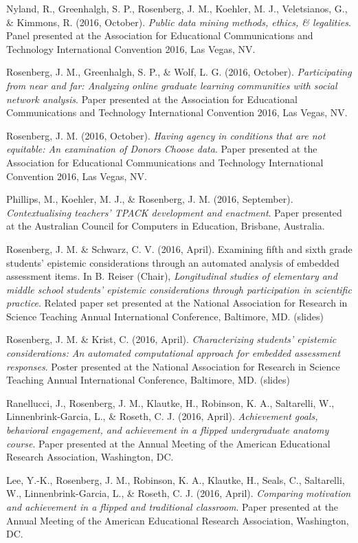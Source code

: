 \documentclass[14,]{article}
\begin{document}
Nyland, R., Greenhalgh, S. P., Rosenberg, J. M., Koehler, M. J.,
Veletsianos, G., \& Kimmons, R. (2016, October). \emph{Public data
mining methods, ethics, \& legalities}. Panel presented at the
Association for Educational Communications and Technology International
Convention 2016, Las Vegas, NV.

Rosenberg, J. M., Greenhalgh, S. P., \& Wolf, L. G. (2016, October).
\emph{Participating from near and far: Analyzing online graduate
learning communities with social network analysis}. Paper presented at
the Association for Educational Communications and Technology
International Convention 2016, Las Vegas, NV.

Rosenberg, J. M. (2016, October). \emph{Having agency in conditions that
are not equitable: An examination of Donors Choose data}. Paper
presented at the Association for Educational Communications and
Technology International Convention 2016, Las Vegas, NV.

Phillips, M., Koehler, M. J., \& Rosenberg, J. M. (2016, September).
\emph{Contextualising teachers' TPACK development and enactment}. Paper
presented at the Australian Council for Computers in Education,
Brisbane, Australia.

Rosenberg, J. M. \& Schwarz, C. V. (2016, April). Examining fifth and
sixth grade students' epistemic considerations through an automated
analysis of embedded assessment items. In B. Reiser (Chair),
\emph{Longitudinal studies of elementary and middle school students'
epistemic considerations through participation in scientific practice}.
Related paper set presented at the National Association for Research in
Science Teaching Annual International Conference, Baltimore, MD.
(slides)

Rosenberg, J. M. \& Krist, C. (2016, April). \emph{Characterizing
students' epistemic considerations: An automated computational approach
for embedded assessment responses}. Poster presented at the National
Association for Research in Science Teaching Annual International
Conference, Baltimore, MD. (slides)

Ranellucci, J., Rosenberg, J. M., Klautke, H., Robinson, K. A.,
Saltarelli, W., Linnenbrink-Garcia, L., \& Roseth, C. J. (2016, April).
\emph{Achievement goals, behavioral engagement, and achievement in a
flipped undergraduate anatomy course}. Paper presented at the Annual
Meeting of the American Educational Research Association, Washington,
DC.

Lee, Y.-K., Rosenberg, J. M., Robinson, K. A., Klautke, H., Seals, C.,
Saltarelli, W., Linnenbrink-Garcia, L., \& Roseth, C. J. (2016, April).
\emph{Comparing motivation and achievement in a flipped and traditional
classroom}. Paper presented at the Annual Meeting of the American
Educational Research Association, Washington, DC.
\end{document}
